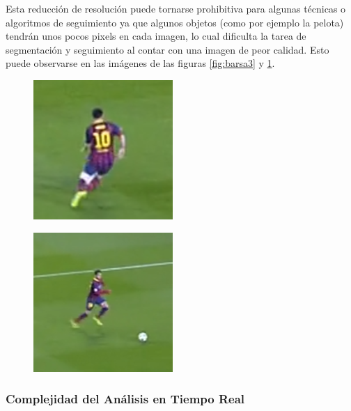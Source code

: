 Esta reducción de resolución puede tornarse prohibitiva para algunas técnicas o
algoritmos de seguimiento ya que algunos objetos (como por ejemplo la pelota)
tendrán unos pocos pixels en cada imagen, lo cual dificulta la tarea de
segmentación y seguimiento al contar con una imagen de peor calidad.  Esto
puede observarse en las imágenes de las figuras \ref{fig:barsa3} y
\ref{fig:barsa4}.

\begin{figure}[H]
    \begin{minipage}[t]{.5\textwidth}
        \centering
        \includegraphics[width=.4\linewidth]{./images/resize_barcelona2.png}
        \label{fig:barsa3}
    \end{minipage}%
    \begin{minipage}[t]{.5\textwidth}
        \centering
        \includegraphics[width=.4\linewidth]{./images/resize_barcelona3.png}
        \label{fig:barsa4}
    \end{minipage}
\end{figure}

\subsubsection{Complejidad del Análisis en Tiempo Real}

